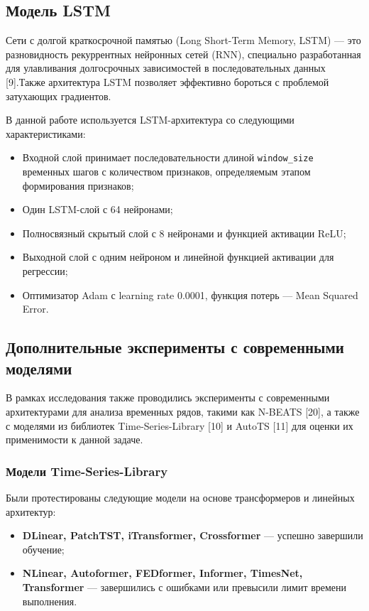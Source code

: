 \subsection{Модель LSTM}
Сети с долгой краткосрочной памятью (Long Short-Term Memory, LSTM) — это разновидность рекуррентных нейронных сетей (RNN), специально разработанная для улавливания долгосрочных зависимостей в последовательных данных [9].Также архитектура LSTM позволяет эффективно бороться с проблемой затухающих градиентов.

В данной работе используется LSTM-архитектура со следующими характеристиками:
\begin{itemize}
	\item Входной слой принимает последовательности длиной \texttt{window\_size} временных шагов с количеством признаков, определяемым этапом формирования признаков;
	\item Один LSTM-слой с 64 нейронами;
	\item Полносвязный скрытый слой с 8 нейронами и функцией активации ReLU;
	\item Выходной слой с одним нейроном и линейной функцией активации для регрессии;
	\item Оптимизатор Adam с learning rate 0.0001, функция потерь --- Mean Squared Error.
\end{itemize}

\subsection{Дополнительные эксперименты с современными моделями}

В рамках исследования также проводились эксперименты с современными архитектурами для анализа временных рядов, такими как N-BEATS [20], а также с моделями из библиотек Time-Series-Library [10] и AutoTS [11] для оценки их применимости к данной задаче.

\subsubsection{Модели Time-Series-Library}

Были протестированы следующие модели на основе трансформеров и линейных архитектур:
\begin{itemize}
	\item \textbf{DLinear, PatchTST, iTransformer, Crossformer} --- успешно завершили обучение;
	\item \textbf{NLinear, Autoformer, FEDformer, Informer, TimesNet, Transformer} --- завершились с ошибками или превысили лимит времени выполнения.
\end{itemize}

